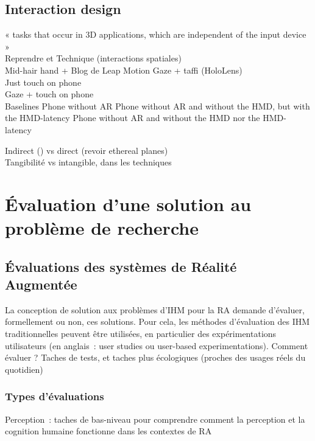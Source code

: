 \subsection*{Interaction design}
    	« tasks that occur in 3D applications, which are independent of the input device » \cite{JankowskiHachet2013} \\
    	Reprendre \cite{Bernatchez2008} et \cite{JankowskiHachet2013}
    	Technique (interactions spatiales) \\
            Mid-hair hand \cite{EnsFinneganIrani2014} \cite{ChanKaoChenEtAl2010} \cite{JonesSodhiForsythEtAl2012} + Blog de Leap Motion
            Gaze + taffi (HoloLens) \\
            Just touch on phone \\
            Gaze + touch on phone \\
            Baselines
            	Phone without AR
            	Phone without AR and without the HMD, but with the HMD-latency
            	Phone without AR and without the HMD nor the HMD-latency

        Indirect (\cite{TeatherStuerzlinger2011}) vs direct (revoir ethereal planes) \\
        Tangibilité vs intangible, dans les techniques \\



\section*{Évaluation d'une solution au problème de recherche}
\subsection*{Évaluations des systèmes de Réalité Augmentée}
La conception de solution aux problèmes d'IHM pour la RA demande d'évaluer, formellement ou non, ces solutions. Pour cela, les méthodes d'évaluation des IHM traditionnelles peuvent être utilisées, en particulier des expérimentations utilisateurs (en anglais~: \foreignlanguage{english}{user studies} ou \foreignlanguage{english}{user-based experimentations}). \citep{SwanGabbard2005}
Comment évaluer ? Taches de tests, et taches plus écologiques (proches des usages réels du quotidien) \cite{DeSaChurchill2013}
\cite{SwanGabbard2005} \cite{DuenserGrassetBillinghurst2008}

\subsubsection*{Types d'évaluations}
Perception~: taches de bas-niveau pour comprendre comment la perception et la cognition humaine fonctionne dans les contextes de RA

